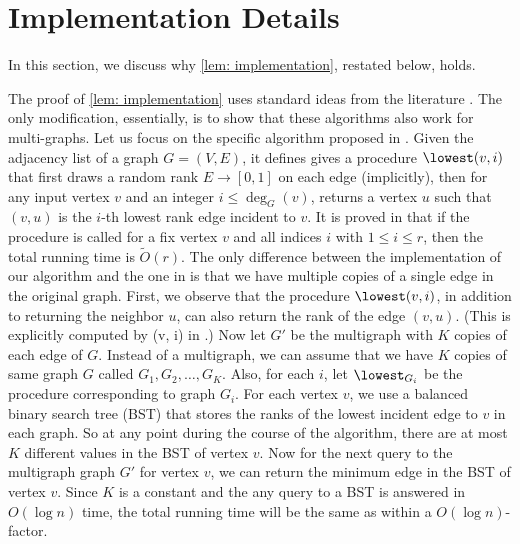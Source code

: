 \section{Implementation Details}\label{sec:implementation}

In this section, we discuss why \cref{lem: implementation}, restated below, holds.

\oracleImplementation*

The proof of \cref{lem: implementation} uses standard ideas from the literature \cite{OnakRRR12,behnezhad2021}. The only modification, essentially, is to show that these algorithms also work for multi-graphs. Let us focus on the specific algorithm proposed in \cite[Appendix~A]{behnezhad2021}. Given the adjacency list of a graph $G=(V, E)$, it defines gives a procedure $\lowest(v,i)$ that first draws a random rank $E \to [0, 1]$ on each edge (implicitly), then for any input vertex $v$ and an integer $i \leq \deg_G(v)$, returns a vertex $u$ such that $(v, u)$ is the $i$-th lowest rank edge incident to $v$. It is proved in \cite{behnezhad2021} that if the procedure is called for a fix vertex $v$ and all indices $i$ with $1 \leq i \leq r$, then the total running time is $\tilde{O}(r)$. The only difference between the implementation of our algorithm and the one in \cite{behnezhad2021} is that we have multiple copies of a single edge in the original graph. First, we observe that the procedure $\lowest(v,i)$, in addition to returning the neighbor $u$, can also return the rank of the edge $(v, u)$. (This is explicitly computed by \lowest(v, i) in \cite{behnezhad2021}.) Now let $G'$ be the multigraph with $K$ copies of each edge of $G$. Instead of a multigraph, we can assume that we have $K$ copies of same graph $G$ called $G_1, G_2, \ldots, G_K$. Also, for each $i$, let $\lowest_{G_i}$ be the \lowest{} procedure corresponding to graph $G_i$. For each vertex $v$, we use a balanced binary search tree (BST) that stores the ranks of the lowest incident edge to $v$ in each graph. So at any point during the course of the algorithm, there are at most $K$ different values in the BST of vertex $v$. Now for the next \lowest{} query to the multigraph graph $G'$ for vertex $v$, we can return the minimum edge in the BST of vertex $v$. Since $K$ is a constant and the any query to a BST is answered in $O(\log n)$ time, the total running time will be the same as \cite[Appendix~A]{behnezhad2021} within a $O(\log n)$-factor.
